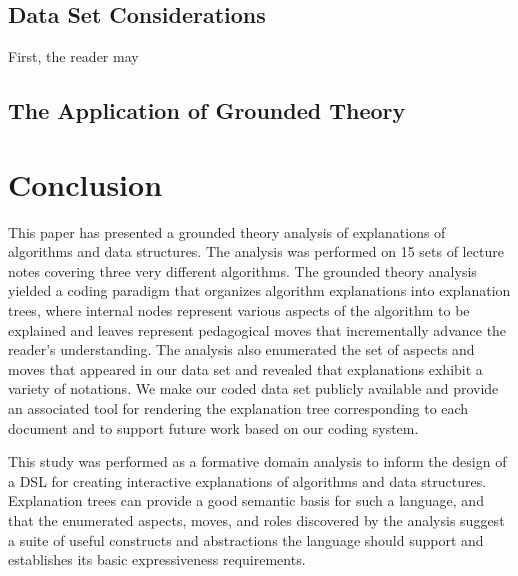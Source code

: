 \documentclass[sigconf]{acmart}
\begin{document}
\subsection{Data Set Considerations}
First, the reader may 

\subsection{The Application of Grounded Theory}

\section{Conclusion}
\label{sec:conc}

This paper has presented a grounded theory analysis of explanations of
algorithms and data structures. The analysis was performed on 15 sets of
lecture notes covering three very different algorithms.
%
The grounded theory analysis yielded a coding paradigm that organizes algorithm
explanations into explanation trees, where internal nodes represent various
aspects of the algorithm to be explained and leaves represent pedagogical moves
that incrementally advance the reader's understanding. The analysis also
enumerated the set of aspects and moves that appeared in our data set and
revealed that explanations exhibit a variety of notations.
%
We make our coded data set publicly available and provide an associated tool
for rendering the explanation tree corresponding to each document and to
support future work based on our coding system.


This study was performed as a formative domain analysis to inform the design of
a DSL for creating interactive explanations of algorithms and data structures.
Explanation trees can provide a good semantic basis for such a language, and
that the enumerated aspects, moves, and roles discovered by the analysis
suggest a suite of useful constructs and abstractions the language should
support and establishes its basic expressiveness requirements.




\end{document}
